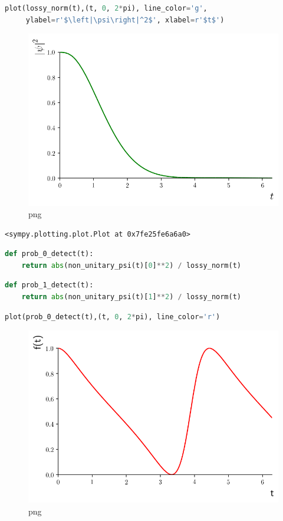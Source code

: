 \begin{lstlisting}[language=Python]
plot(lossy_norm(t),(t, 0, 2*pi), line_color='g',
     ylabel=r'$\left|\psi\right|^2$', xlabel=r'$t$')
\end{lstlisting}

\begin{figure}
\centering
\includegraphics[width=0.6\linewidth]{output_31_0.png}
\caption[]{png}
\end{figure}

\begin{lstlisting}
<sympy.plotting.plot.Plot at 0x7fe25fe6a6a0>
\end{lstlisting}

\begin{lstlisting}[language=Python]
def prob_0_detect(t):
    return abs(non_unitary_psi(t)[0]**2) / lossy_norm(t)
\end{lstlisting}

\begin{lstlisting}[language=Python]
def prob_1_detect(t):
    return abs(non_unitary_psi(t)[1]**2) / lossy_norm(t)
\end{lstlisting}

\begin{lstlisting}[language=Python]
plot(prob_0_detect(t),(t, 0, 2*pi), line_color='r')
\end{lstlisting}

\begin{figure}
\centering
\includegraphics[width=0.6\linewidth]{output_34_0.png}
\caption[]{png}
\end{figure}

